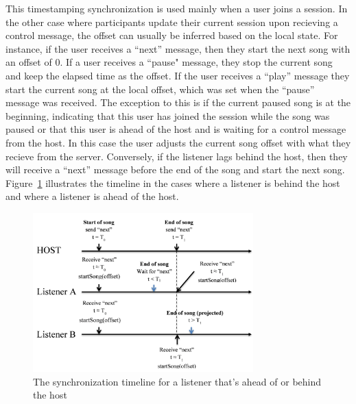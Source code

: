 This timestamping synchronization is used mainly when a user joins a session.
In the other case where participants update their current session upon 
recieving a control message, the offset can usually be inferred based on the local state. 
For instance, if the user receives a ``next'' message, then they
start the next song with an offset of 0. If a user receives a ``pause" 
message, they stop the current song and keep the elapsed time as the offset.
If the user receives a ``play'' message they start the current song at the 
local offset, which was set when the ``pause'' message was received. The exception to this 
is if the current paused song is at the beginning, indicating
that this user has joined the session while the song was paused or that this user is
ahead of the host and is waiting for a control message from the host. 
In this case the user adjusts the current song offset with what 
they recieve from the server. Conversely, if the listener lags behind the host, then they will
receive a ``next'' message before the end of the song and start the next song. Figure~\ref{fig:syncUsers}
illustrates the timeline in the cases where a listener is behind the host and where a listener
is ahead of the host.

\begin{figure}[t!]
	\centering
	\includegraphics[width=85mm]{syncSessionUsers.png}
	\caption{The synchronization timeline for a listener that's ahead of or behind the host}
	\label{fig:syncUsers}
\end{figure}


